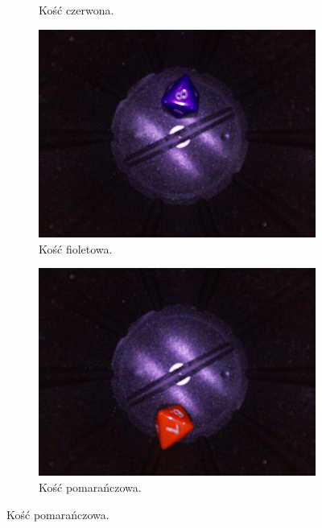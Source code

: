 \begin{figure}[H]
\begin{subfigure}{0.32\textwidth}
        \caption{\label{fig:czerwona}Kość czerwona.}
    \end{subfigure}
    \hfill
    \begin{subfigure}{0.32\textwidth}
        \centering
        \includegraphics[width=\linewidth]{chapters/03-praca-wlasna/figures/kolorki/fiolet.jpg}
        \caption{\label{fig:fiolet}Kość fioletowa.}
    \end{subfigure}
    \hfill
    \begin{subfigure}{0.32\textwidth}
        \centering
        \includegraphics[width=\linewidth]{chapters/03-praca-wlasna/figures/kolorki/pomaranczowa.jpg}
        \caption{\label{fig:orange}Kość pomarańczowa.}
    \end{subfigure}

\end{figure}
